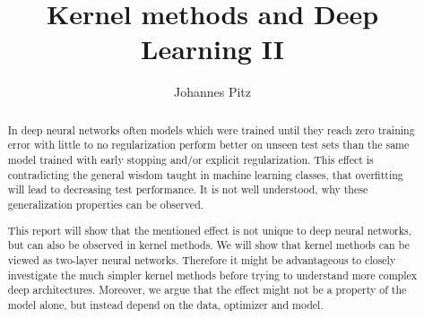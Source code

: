 \documentclass[a4paper,10pt]{article}
\title{Kernel methods and Deep Learning II} %
\author{Johannes Pitz} %
\institute{\textit{Seminar: Optimization and Generalization in Deep Learning}}
\begin{document}
\maketitle

\begin{abstract}

In deep neural networks often models which were trained until they reach zero training error with little to no regularization perform better on unseen test sets than the same model trained with early stopping and/or explicit regularization. This effect is contradicting the general wisdom taught in machine learning classes, that overfitting will lead to decreasing test performance. It is not well understood, why these generalization properties can be observed. 

This report will show that the mentioned effect is not unique to deep neural networks, but can also be observed in kernel methods. We will show that kernel methods can be viewed as two-layer neural networks. Therefore it might be advantageous to closely investigate the much simpler kernel methods before trying to understand more complex deep architectures. Moreover, we argue that the effect might not be a property of the model alone, but instead depend on the data, optimizer and model.


\end{abstract}














\newpage


\end{document}
